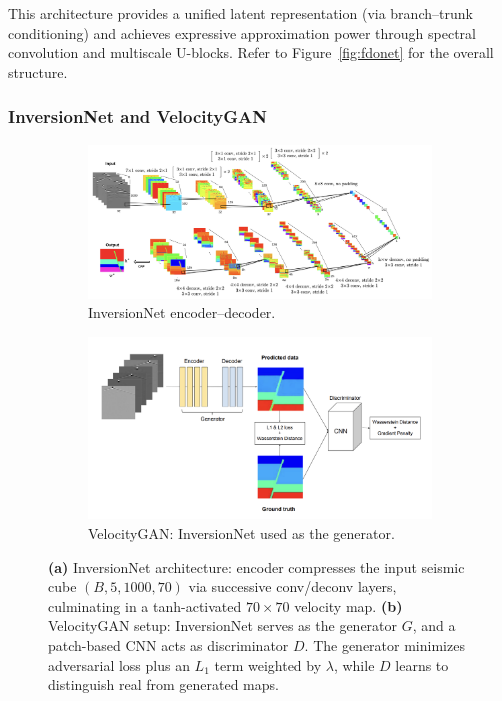 \documentclass{article}
\begin{document}
This architecture provides a unified latent representation (via branch–trunk conditioning) and achieves expressive approximation power through spectral convolution and multiscale U-blocks. Refer to Figure~\ref{fig:fdonet} for the overall structure.


\subsubsection{InversionNet and VelocityGAN}

\begin{figure}
    \centering
    \begin{subfigure}[b]{0.48\linewidth}
      \centering
      \includegraphics[width=\linewidth]{figures/InversionNet.png}
      \caption{InversionNet encoder–decoder.}
      \label{fig:inversionnet_sub}
    \end{subfigure}
    \hfill
    \begin{subfigure}[b]{0.48\linewidth}
      \centering
      \includegraphics[width=\linewidth]{figures/VelocityGAN.png}
      \caption{VelocityGAN: InversionNet used as the generator.}
      \label{fig:velocitygan_sub}
    \end{subfigure}
    \caption{\textbf{(a)} InversionNet architecture: encoder compresses the input seismic cube $(B,5,1000,70)$ via successive conv/deconv layers, culminating in a tanh-activated $70\times70$ velocity map. \textbf{(b)} VelocityGAN setup: InversionNet serves as the generator $G$, and a patch-based CNN acts as discriminator $D$. The generator minimizes adversarial loss plus an $L_1$ term weighted by $\lambda$, while $D$ learns to distinguish real from generated maps.}
    \label{fig:inversion_velocitygan}
  \end{figure}
  
\end{document}
